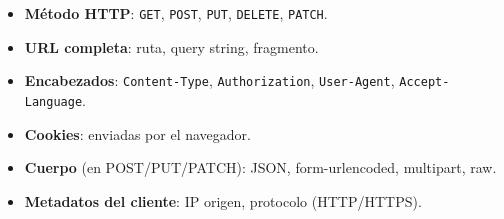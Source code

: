 \documentclass[11pt,a4paper,openany]{book}
\begin{document}
\begin{itemize}
\item \textbf{Método HTTP}: \texttt{GET}, \texttt{POST}, \texttt{PUT},
\texttt{DELETE}, \texttt{PATCH}.
\item \textbf{URL completa}: ruta, query string, fragmento.
\item \textbf{Encabezados}: \texttt{Content-Type},
\texttt{Authorization}, \texttt{User-Agent}, \texttt{Accept-Language}.
\item \textbf{Cookies}: enviadas por el navegador.
\item \textbf{Cuerpo} (en POST/PUT/PATCH): JSON, form-urlencoded,
multipart, raw.
\item \textbf{Metadatos del cliente}: IP origen, protocolo (HTTP/HTTPS).
\end{itemize}
\end{document}

